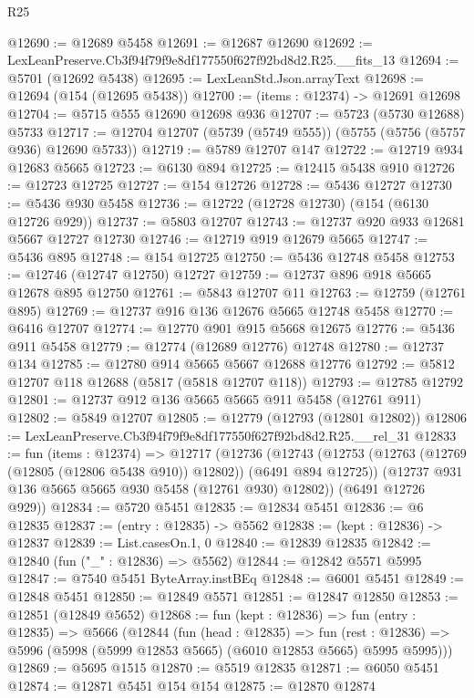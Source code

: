 \begin{lexlean}{R25}
\begin{coremodule}
@12690 := @12689 @5458
@12691 := @12687 @12690
@12692 := LexLeanPreserve.Cb3f94f79f9e8df177550f627f92bd8d2.R25.__fits_13
@12694 := @5701 (@12692 @5438)
@12695 := LexLeanStd.Json.arrayText
@12698 := @12694 (@154 (@12695 @5438))
@12700 := (items : @12374) -> @12691 @12698
@12704 := @5715 @555 @12690 @12698 @936
@12707 := @5723 (@5730 @12688) @5733
@12717 := @12704 @12707 (@5739 (@5749 @555)) (@5755 (@5756 (@5757 @936) @12690 @5733))
@12719 := @5789 @12707 @147
@12722 := @12719 @934 @12683 @5665
@12723 := @6130 @894
@12725 := @12415 @5438 @910
@12726 := @12723 @12725
@12727 := @154 @12726
@12728 := @5436 @12727
@12730 := @5436 @930 @5458
@12736 := @12722 (@12728 @12730) (@154 (@6130 @12726 @929))
@12737 := @5803 @12707
@12743 := @12737 @920 @933 @12681 @5667 @12727 @12730
@12746 := @12719 @919 @12679 @5665
@12747 := @5436 @895
@12748 := @154 @12725
@12750 := @5436 @12748 @5458
@12753 := @12746 (@12747 @12750) @12727
@12759 := @12737 @896 @918 @5665 @12678 @895 @12750
@12761 := @5843 @12707 @11
@12763 := @12759 (@12761 @895)
@12769 := @12737 @916 @136 @12676 @5665 @12748 @5458
@12770 := @6416 @12707
@12774 := @12770 @901 @915 @5668 @12675
@12776 := @5436 @911 @5458
@12779 := @12774 (@12689 @12776) @12748
@12780 := @12737 @134
@12785 := @12780 @914 @5665 @5667 @12688 @12776
@12792 := @5812 @12707 @118 @12688 (@5817 (@5818 @12707 @118))
@12793 := @12785 @12792
@12801 := @12737 @912 @136 @5665 @5665 @911 @5458 (@12761 @911)
@12802 := @5849 @12707
@12805 := @12779 (@12793 (@12801 @12802))
@12806 := LexLeanPreserve.Cb3f94f79f9e8df177550f627f92bd8d2.R25.__rel_31
@12833 := fun (items : @12374) =>
  @12717
    (@12736
      (@12743
        (@12753 (@12763 (@12769 (@12805 (@12806 @5438 @910)) @12802)) (@6491 @894 @12725))
        (@12737 @931 @136 @5665 @5665 @930 @5458 (@12761 @930) @12802))
      (@6491 @12726 @929))
@12834 := @5720 @5451
@12835 := @12834 @5451
@12836 := @6 @12835
@12837 := (entry : @12835) -> @5562
@12838 := (kept : @12836) -> @12837
@12839 := List.casesOn.{1, 0}
@12840 := @12839 @12835
@12842 := @12840 (fun ("_" : @12836) => @5562)
@12844 := @12842 @5571 @5995
@12847 := @7540 @5451 ByteArray.instBEq
@12848 := @6001 @5451
@12849 := @12848 @5451
@12850 := @12849 @5571
@12851 := @12847 @12850
@12853 := @12851 (@12849 @5652)
@12868 := fun (kept : @12836) =>
  fun (entry : @12835) =>
  @5666
    (@12844
      (fun (head : @12835) =>
      fun (rest : @12836) => @5996 (@5998 (@5999 @12853 @5665) (@6010 @12853 @5665) @5995 @5995)))
@12869 := @5695 @1515
@12870 := @5519 @12835
@12871 := @6050 @5451
@12874 := @12871 @5451 @154 @154
@12875 := @12870 @12874

\end{coremodule}
\end{lexlean}
